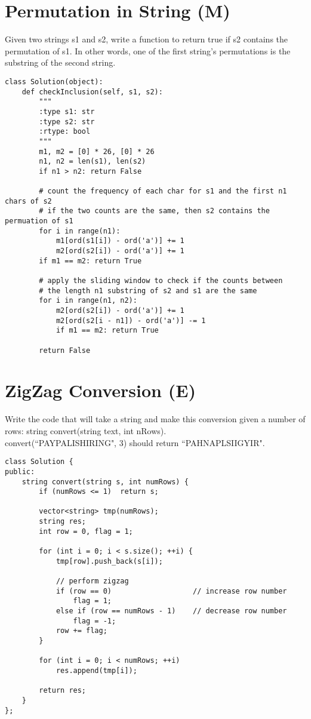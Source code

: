 \section{Permutation in String (M)}
Given two strings s1 and s2, write a function to return true if s2 contains the permutation of s1. In other words, one of the first string's permutations is the substring of the second string.

\begin{lstlisting}
class Solution(object):
    def checkInclusion(self, s1, s2):
        """
        :type s1: str
        :type s2: str
        :rtype: bool
        """
        m1, m2 = [0] * 26, [0] * 26
        n1, n2 = len(s1), len(s2)
        if n1 > n2: return False
        
        # count the frequency of each char for s1 and the first n1 chars of s2 
        # if the two counts are the same, then s2 contains the permuation of s1
        for i in range(n1):
            m1[ord(s1[i]) - ord('a')] += 1
            m2[ord(s2[i]) - ord('a')] += 1
        if m1 == m2: return True
        
        # apply the sliding window to check if the counts between
        # the length n1 substring of s2 and s1 are the same
        for i in range(n1, n2):
            m2[ord(s2[i]) - ord('a')] += 1
            m2[ord(s2[i - n1]) - ord('a')] -= 1
            if m1 == m2: return True
            
        return False
\end{lstlisting}

\section{ZigZag Conversion (E)}
Write the code that will take a string and make this conversion given a number of rows: string convert(string text, int nRows). \\
convert(``PAYPALISHIRING", 3) should return ``PAHNAPLSIIGYIR". \\

\begin{lstlisting}
class Solution {
public:
    string convert(string s, int numRows) {
        if (numRows <= 1)  return s;
        
        vector<string> tmp(numRows);
        string res;
        int row = 0, flag = 1;
        
        for (int i = 0; i < s.size(); ++i) {
            tmp[row].push_back(s[i]);
            
            // perform zigzag
            if (row == 0)                   // increase row number
                flag = 1;
            else if (row == numRows - 1)    // decrease row number
                flag = -1;
            row += flag;
        }
        
        for (int i = 0; i < numRows; ++i)
            res.append(tmp[i]);
            
        return res;
    }
};
\end{lstlisting}


